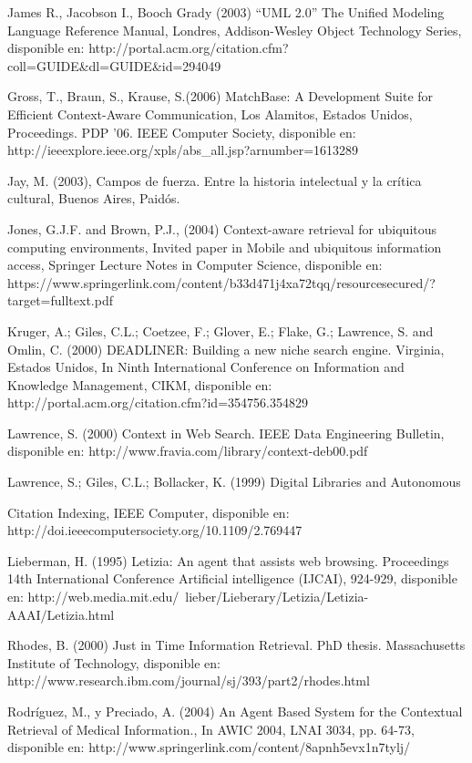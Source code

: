 \begin{thebibliography}{1}
James R., Jacobson I., Booch Grady (2003) “UML 2.0” The Unified Modeling
Language Reference Manual, Londres, Addison-Wesley Object Technology Series,
disponible en: http://portal.acm.org/citation.cfm?coll=GUIDE&dl=GUIDE&id=294049


\bibitem{}
Gross, T., Braun, S., Krause, S.(2006) MatchBase: A Development Suite for
Efficient Context-Aware Communication, Los Alamitos, Estados Unidos,
Proceedings. PDP ’06. IEEE Computer Society, disponible en:
http://ieeexplore.ieee.org/xpls/abs_all.jsp?arnumber=1613289


\bibitem{}
Jay, M. (2003), Campos de fuerza. Entre la historia intelectual y la crítica
cultural, Buenos Aires, Paidós.


\bibitem{} 
Jones, G.J.F. and Brown, P.J., (2004) Context-aware retrieval for ubiquitous
computing environments, Invited paper in Mobile and ubiquitous information
access, Springer Lecture Notes in Computer Science, disponible en:
https://www.springerlink.com/content/b33d471j4xa72tqq/resourcesecured/?
target=fulltext.pdf



\bibitem{} 
Kruger, A.; Giles, C.L.; Coetzee, F.; Glover, E.; Flake, G.; Lawrence, S. and
Omlin, C. (2000) DEADLINER: Building a new niche search engine. Virginia,
Estados Unidos, In Ninth International Conference on Information and Knowledge
Management, CIKM, disponible
en: http://portal.acm.org/citation.cfm?id=354756.354829

\bibitem{} 
Lawrence, S. (2000) Context in Web Search. IEEE Data Engineering Bulletin,
disponible en: http://www.fravia.com/library/context-deb00.pdf

\bibitem{} 
Lawrence, S.; Giles, C.L.; Bollacker, K. (1999) Digital Libraries and Autonomous


\bibitem{} 
Citation Indexing, IEEE Computer, disponible en:
http://doi.ieeecomputersociety.org/10.1109/2.769447

\bibitem{} 
Lieberman, H. (1995) Letizia: An agent that assists web browsing. Proceedings
14th International Conference Artificial intelligence (IJCAI), 924-929,
disponible en:
http://web.media.mit.edu/~lieber/Lieberary/Letizia/Letizia-AAAI/Letizia.html

\bibitem{} 
Rhodes, B. (2000) Just in Time Information Retrieval. PhD thesis. Massachusetts
Institute of Technology, disponible en:
http://www.research.ibm.com/journal/sj/393/part2/rhodes.html


\bibitem{} 
Rodríguez, M., y Preciado, A. (2004) An Agent Based System for the Contextual
Retrieval of Medical Information., In AWIC 2004, LNAI 3034, pp. 64-73,
disponible en: http://www.springerlink.com/content/8apnh5evx1n7tylj/


\end{thebibliography}
